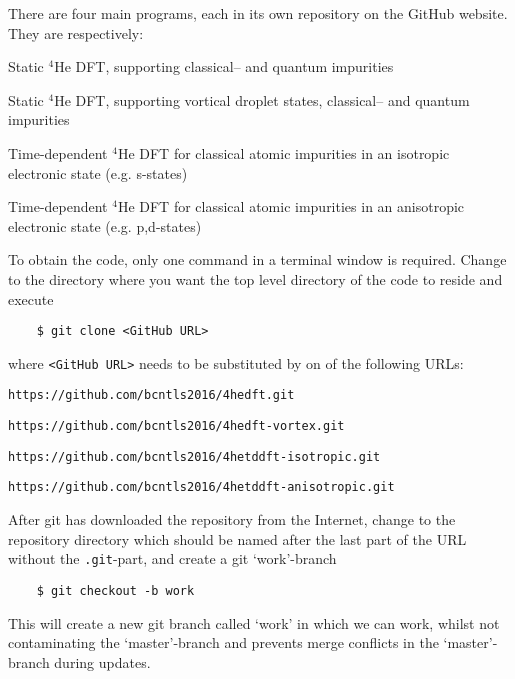\documentclass[10pt,a4paper]{article}
\begin{document}
	There are four main programs, each in its own repository on the GitHub website. They are respectively:
	\begin{description}[align=right,labelwidth=0.50cm]
		\item [1. ] Static $^4$He DFT, supporting classical-- and quantum impurities
		\item[2. ] Static $^4$He DFT, supporting vortical droplet states, classical-- and quantum impurities 
		\item[3. ] Time-dependent $^4$He DFT for classical atomic impurities in an isotropic electronic state (e.g. s-states)
		\item[4. ] Time-dependent $^4$He DFT for classical atomic impurities in an anisotropic electronic state (e.g. p,d-states)
	\end{description}
	To obtain the code, only one command in a terminal window is required. Change to the directory where you want the top level directory of the code to reside and execute
	\begin{verbatim}
	$ git clone <GitHub URL>
	\end{verbatim}
	where \verb|<GitHub URL>| needs to be substituted by on of the following URLs:
	\begin{description}[align=right,labelwidth=0.5cm]
		\item[1. ] \verb|https://github.com/bcntls2016/4hedft.git|
		\item[2. ] \verb|https://github.com/bcntls2016/4hedft-vortex.git|
		\item[3. ] \verb|https://github.com/bcntls2016/4hetddft-isotropic.git|
		\item[4. ] \verb|https://github.com/bcntls2016/4hetddft-anisotropic.git|
	\end{description}

	After git has downloaded the repository from the Internet, change to the repository directory which should be named after the last part of the URL without the \verb|.git|-part, and create a git `work'-branch
	\begin{verbatim}
	$ git checkout -b work
	\end{verbatim}
	This will create a new git branch called `work' in which we can work, whilst not contaminating the `master'-branch and prevents merge conflicts in the `master'-branch during updates.
\end{document}
